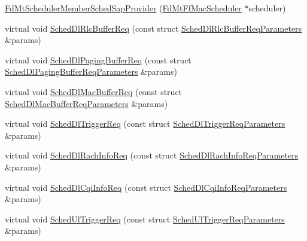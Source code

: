 \begin{DoxyCompactItemize}
\item 
\hyperlink{classns3_1_1FdMtSchedulerMemberSchedSapProvider_aeed08753d2d24208ce8c2e628b44af83}{Fd\+Mt\+Scheduler\+Member\+Sched\+Sap\+Provider} (\hyperlink{classns3_1_1FdMtFfMacScheduler}{Fd\+Mt\+Ff\+Mac\+Scheduler} $\ast$scheduler)
\item 
virtual void \hyperlink{classns3_1_1FdMtSchedulerMemberSchedSapProvider_a4e08f45c3e4f6cf4765f70f6ae4d8f87}{Sched\+Dl\+Rlc\+Buffer\+Req} (const struct \hyperlink{structns3_1_1FfMacSchedSapProvider_1_1SchedDlRlcBufferReqParameters}{Sched\+Dl\+Rlc\+Buffer\+Req\+Parameters} \&params)
\item 
virtual void \hyperlink{classns3_1_1FdMtSchedulerMemberSchedSapProvider_a65537b575a13381b8fda8272e3d8d341}{Sched\+Dl\+Paging\+Buffer\+Req} (const struct \hyperlink{structns3_1_1FfMacSchedSapProvider_1_1SchedDlPagingBufferReqParameters}{Sched\+Dl\+Paging\+Buffer\+Req\+Parameters} \&params)
\item 
virtual void \hyperlink{classns3_1_1FdMtSchedulerMemberSchedSapProvider_a1ac5cdc1c77391c5938526b2f05ab763}{Sched\+Dl\+Mac\+Buffer\+Req} (const struct \hyperlink{structns3_1_1FfMacSchedSapProvider_1_1SchedDlMacBufferReqParameters}{Sched\+Dl\+Mac\+Buffer\+Req\+Parameters} \&params)
\item 
virtual void \hyperlink{classns3_1_1FdMtSchedulerMemberSchedSapProvider_a1ea400f2113591f6b8fecfc50dafc264}{Sched\+Dl\+Trigger\+Req} (const struct \hyperlink{structns3_1_1FfMacSchedSapProvider_1_1SchedDlTriggerReqParameters}{Sched\+Dl\+Trigger\+Req\+Parameters} \&params)
\item 
virtual void \hyperlink{classns3_1_1FdMtSchedulerMemberSchedSapProvider_a33990c7512640e8a2e14de61d92730d6}{Sched\+Dl\+Rach\+Info\+Req} (const struct \hyperlink{structns3_1_1FfMacSchedSapProvider_1_1SchedDlRachInfoReqParameters}{Sched\+Dl\+Rach\+Info\+Req\+Parameters} \&params)
\item 
virtual void \hyperlink{classns3_1_1FdMtSchedulerMemberSchedSapProvider_aa39a7c203e147319a3704f8837d65d37}{Sched\+Dl\+Cqi\+Info\+Req} (const struct \hyperlink{structns3_1_1FfMacSchedSapProvider_1_1SchedDlCqiInfoReqParameters}{Sched\+Dl\+Cqi\+Info\+Req\+Parameters} \&params)
\item 
virtual void \hyperlink{classns3_1_1FdMtSchedulerMemberSchedSapProvider_ad1df7ddb8ca2f4bde4055703ee1cac4c}{Sched\+Ul\+Trigger\+Req} (const struct \hyperlink{structns3_1_1FfMacSchedSapProvider_1_1SchedUlTriggerReqParameters}{Sched\+Ul\+Trigger\+Req\+Parameters} \&params)

\end{DoxyCompactItemize}
